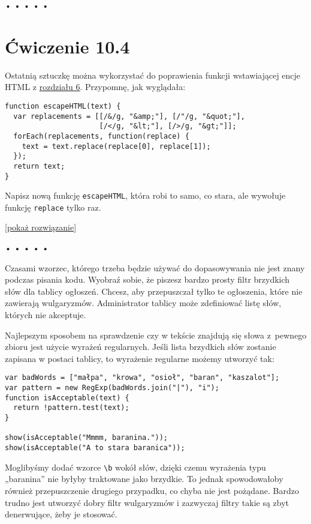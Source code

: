\begin{center}
• • • • •
\end{center}

  
\section*{Ćwiczenie 10.4}
\label{sec:10.4}
  
    
Ostatnią sztuczkę można wykorzystać do poprawienia funkcji wstawiającej encje HTML z \hyperref[chap:6]{rozdziału 6}. Przypomnę, jak wyglądała: 

    
\begin{verbatim} 
function escapeHTML(text) {
  var replacements = [[/&/g, "&amp;"], [/"/g, "&quot;"],
                      [/</g, "&lt;"], [/>/g, "&gt;"]];
  forEach(replacements, function(replace) {
    text = text.replace(replace[0], replace[1]);
  });
  return text;
}
 \end{verbatim}
    
Napisz nową funkcję \texttt{escapeHTML}, która robi to samo, co stara, ale wywołuje funkcję \texttt{replace} tylko raz.

  
[\hyperref[sol:10.4]{pokaż rozwiązanie}]
  


\begin{center}
• • • • •
\end{center}

  
Czasami wzorzec, którego trzeba będzie używać do dopasowywania nie jest znany podczas pisania kodu. Wyobraź sobie, że piszesz bardzo prosty filtr brzydkich słów dla tablicy ogłoszeń. Chcesz, aby przepuszczał tylko te ogłoszenia, które nie zawierają wulgaryzmów. Administrator tablicy może zdefiniować listę słów, których nie akceptuje.

  
Najlepszym sposobem na sprawdzenie czy w tekście znajdują się słowa z~pewnego zbioru jest użycie wyrażeń regularnych. Jeśli lista brzydkich słów zostanie zapisana w postaci tablicy, to wyrażenie regularne możemy utworzyć tak:

  
\begin{verbatim} 
var badWords = ["małpa", "krowa", "osioł", "baran", "kaszalot"];
var pattern = new RegExp(badWords.join("|"), "i");
function isAcceptable(text) {
  return !pattern.test(text);
}

show(isAcceptable("Mmmm, baranina."));
show(isAcceptable("A to stara baranica"));
 \end{verbatim}
  
Moglibyśmy dodać wzorce \texttt{\textbackslash b} wokół słów, dzięki czemu wyrażenia typu „baranina” nie byłyby traktowane jako brzydkie. To jednak spowodowałoby również przepuszczenie drugiego przypadku, co chyba nie jest pożądane. Bardzo trudno jest utworzyć dobry filtr wulgaryzmów i zazwyczaj filtry takie są zbyt denerwujące, żeby je stosować.

